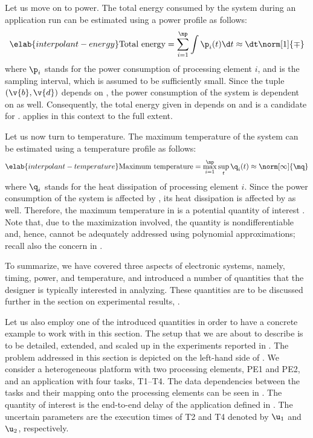 Let us move on to power. The total energy consumed by the system during an
application run can be estimated using a power profile \mp as follows:
\begin{equation} \elab{interpolant-energy}
  \text{Total energy}
  = \sum_{i = 1}^\np \int \p_i(t) \d t
  \approx \dt \norm[1]{\mp}
\end{equation}
where $\p_i$ stands for the power consumption of processing element $i$, and \dt
is the sampling interval, which is assumed to be sufficiently small. Since the
tuple $(\v{b}, \v{d})$ depends on \vu, the power consumption of the system is
dependent on \vu as well. Consequently, the total energy given in
 depends on \vu and is a candidate for \g.
 applies in this context to the full extent.

Let us now turn to temperature. The maximum temperature of the system can be
estimated using a temperature profile \mq as follows:
\begin{equation} \elab{interpolant-temperature}
  \text{Maximum temperature}
  = \max_{i = 1}^\np \sup_{t} \q_i(t)
  \approx \norm[\infty]{\mq}
\end{equation}
where $\q_i$ stands for the heat dissipation of processing element $i$. Since
the power consumption of the system is affected by \vu, its heat dissipation is
affected by \vu as well. Therefore, the maximum temperature in
 is a potential quantity of interest \g. Note
that, due to the maximization involved, the quantity is nondifferentiable and,
hence, cannot be adequately addressed using polynomial approximations; recall
also the concern in .

To summarize, we have covered three aspects of electronic systems, namely,
timing, power, and temperature, and introduced a number of quantities that the
designer is typically interested in analyzing. These quantities are to be
discussed further in the section on experimental results,
.

Let us also employ one of the introduced quantities in order to have a concrete
example to work with in this section. The setup that we are about to describe is
to be detailed, extended, and scaled up in the experiments reported in
. The problem addressed in this section is depicted on
the left-hand side of . We consider a heterogeneous
platform with two processing elements, PE1 and PE2, and an application with four
tasks, T1--T4. The data dependencies between the tasks and their mapping onto
the processing elements can be seen in . The quantity of
interest \g is the end-to-end delay of the application defined in
. The uncertain parameters \vu are the execution times
of T2 and T4 denoted by $\u_1$ and $\u_2$, respectively.

